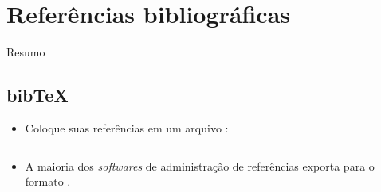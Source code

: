 \documentclass{beamer}
\begin{document}
\section{Referências bibliográficas}

\begin{frame}{Resumo}
\begin{multicols}{2}
\tableofcontents[currentsection]
\end{multicols}
\end{frame}

\subsection{bib\TeX}
\begin{frame}[fragile]{\insertsubsection{}}
\begin{itemize}
  \item Coloque suas referências em um arquivo :
  \inputminted[fontsize=\tiny,frame=single]{latex}{bib-example.bib}
  \item A maioria dos \emph{softwares} de administração de referências exporta para o formato .
\end{itemize}
\end{frame}
\end{document}
